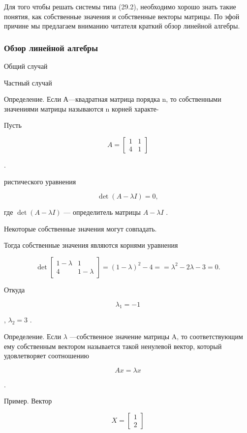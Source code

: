 \documentclass[
  ukrainian,
]{article}
\begin{document}
Для того чтобы решать системы типа (29.2), необходимо хорошо знать такие
понятия, как собственные значения и собственные векторы матрицы. По эфой
причине мы предлагаем вниманию читателя краткий обзор линейной алгебры.

\subsubsection{Обзор линейной
алгебры}\label{ux43eux431ux437ux43eux440-ux43bux438ux43dux435ux439ux43dux43eux439-ux430ux43bux433ux435ux431ux440ux44b}

Общий случай

Частный случай

Определение. Если А---квадратная матрица порядка n, то собственными
значениями матрицы называются n корней характе-

Пусть

\[
A = \begin{bmatrix} 1 & 1 \\ 4 & 1 \end{bmatrix}
\]

.

ристического уравнения

\[
\det\left(A-\lambda I\right)=0,
\]

где \(\det(A-\lambda I)\) --- определитель матрицы \(A-\lambda I\) .

Некоторые собственные значения могут совпадать.

Тогда собственные значения являются корнями уравнения

\[
\det \begin{bmatrix} 1-\lambda & 1\\ 4 & 1-\lambda \end{bmatrix} = (1-\lambda)^2 - 4 =
= \lambda^2 - 2\lambda - 3 = 0.
\]

Откуда

\[
\lambda_1 = -1
\]

, \(\lambda_2 = 3\) .

Определение. Если \(\lambda\) ---собственное значение матрицы A, то
соответствующим ему собственным вектором называется такой ненулевой
вектор, который удовлетворяет соотношению

\[
Ax = \lambda x
\]

.

Пример. Вектор

\[
X = \begin{bmatrix} 1 \\ 2 \end{bmatrix}
\]
\end{document}
